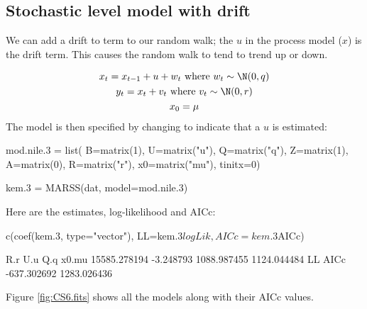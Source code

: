 \subsection{Stochastic level model with drift}
We can add a drift to term to our random walk; the $u$ in the process model ($x$) is the drift term.  This causes the random walk to tend to trend up or down.  

\begin{equation}
\begin{gathered}
x_t = x_{t-1}+u+w_t \text{ where } w_t \sim \N(0,q) \\
y_t = x_t+v_t \text{ where } v_t \sim \N(0,r)  \\
x_0 = \mu
\end{gathered}   
\label{eq:random.walk.w.noise.w.drift}
\end{equation}
The model is then specified by changing \verb@U@ to indicate that a $u$ is estimated:
\begin{Schunk}
\begin{Sinput}
 mod.nile.3 = list(
 B=matrix(1), U=matrix("u"), Q=matrix("q"),
 Z=matrix(1), A=matrix(0), R=matrix("r"),
 x0=matrix("mu"), tinitx=0)
\end{Sinput}
\end{Schunk}
\begin{Schunk}
\begin{Sinput}
 kem.3 = MARSS(dat, model=mod.nile.3)
\end{Sinput}
\end{Schunk}
Here are the estimates, log-likelihood and AICc:
\begin{Schunk}
\begin{Sinput}
 c(coef(kem.3, type="vector"), LL=kem.3$logLik, AICc=kem.3$AICc)
\end{Sinput}
\begin{Soutput}
         R.r          U.u          Q.q        x0.mu 
15585.278194    -3.248793  1088.987455  1124.044484 
          LL         AICc 
 -637.302692  1283.026436 
\end{Soutput}
\end{Schunk}

Figure \ref{fig:CS6.fits} shows all the models along with their AICc values. 


